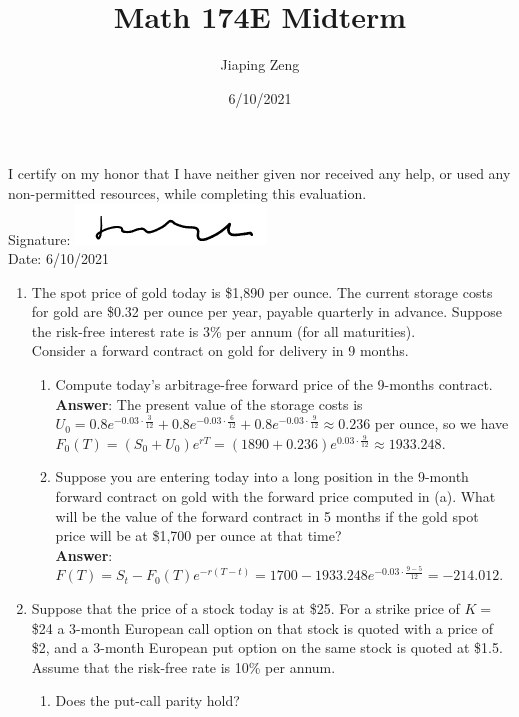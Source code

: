 \documentclass{article}
\title{Math 174E Midterm}
\date{6/10/2021}
\author{Jiaping Zeng}
\begin{document}

I certify on my honor that I have neither given nor received any help, or used any non-permitted resources, while completing this evaluation.\\
Signature: \includegraphics[width=2in]{signature.png}\\
Date: 6/10/2021
\newpage
\begin{enumerate}
      \item The spot price of gold today is \$1,890 per ounce. The current storage costs for gold are \$0.32 per ounce per year, payable quarterly in advance. Suppose the risk-free interest rate is 3\% per annum (for all maturities).\\
            Consider a forward contract on gold for delivery in 9 months.
            \begin{enumerate}
                  \item Compute today's arbitrage-free forward price of the 9-months contract.\\
                        \textbf{Answer}: The present value of the storage costs is $U_0=0.8e^{-0.03\cdot\frac{3}{12}}+0.8e^{-0.03\cdot\frac{6}{12}}+0.8e^{-0.03\cdot\frac{9}{12}}\approx 0.236$ per ounce, so we have $F_0(T)=(S_0+U_0)e^{rT}=(1890+0.236)e^{0.03\cdot\frac{9}{12}}\approx 1933.248$.
                  \item Suppose you are entering today into a long position in the 9-month forward contract on gold with the forward price computed in (a). What will be the value of the forward contract in 5 months if the gold spot price will be at \$1,700 per ounce at that time?\\
                        \textbf{Answer}: $F(T)=S_t-F_0(T)e^{-r(T-t)}=1700-1933.248e^{-0.03\cdot\frac{9-5}{12}}=-214.012$.
            \end{enumerate}
            \newpage
      \item Suppose that the price of a stock today is at \$25. For a strike price of $K=$\$24 a 3-month European call option on that stock is quoted with a price of \$2, and a 3-month European put option on the same stock is quoted at \$1.5. Assume that the risk-free rate is 10\% per annum.
            \begin{enumerate}
                  \item Does the put-call parity hold?\\

\end{enumerate}
\end{enumerate}
\end{document}
